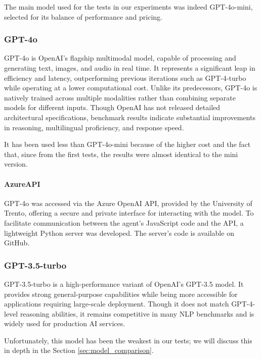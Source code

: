 The main model used for the tests in our experiments was indeed GPT-4o-mini,
selected for its balance of performance and pricing.

\subsubsection{GPT-4o}
GPT-4o is OpenAI's flagship multimodal model, capable of processing and generating
text, images, and audio in real time. It represents a significant leap in
efficiency and latency, outperforming previous iterations such as GPT-4-turbo while
operating at a lower computational cost. Unlike its predecessors, GPT-4o is natively
trained across multiple modalities rather than combining separate models for different
inputs. Though OpenAI has not released detailed architectural specifications, benchmark
results indicate substantial improvements in reasoning, multilingual proficiency,
and response speed.

It has been used less than GPT-4o-mini because of the higher cost and the fact that,
since from the first tests, the results were almost identical to the mini version.

\paragraph{AzureAPI}
\label{par:azureapi} GPT-4o was accessed via the Azure OpenAI API, provided by the
University of Trento, offering a secure and private interface for interacting
with the model. To facilitate communication between the agent's JavaScript code and
the API, a lightweight Python server was developed. The server's code is available
on GitHub\cite{projectrepo}.

\subsubsection{GPT-3.5-turbo}
GPT-3.5-turbo is a high-performance variant of OpenAI's GPT-3.5 model. It provides
strong general-purpose capabilities while being more accessible for applications
requiring large-scale deployment. Though it does not match GPT-4-level reasoning
abilities, it remains competitive in many NLP benchmarks and is widely used for production
AI services.

Unfortunately, this model has been the weakest in our tests; we will discuss this
in depth in the Section \ref{sec:model_comparison}.